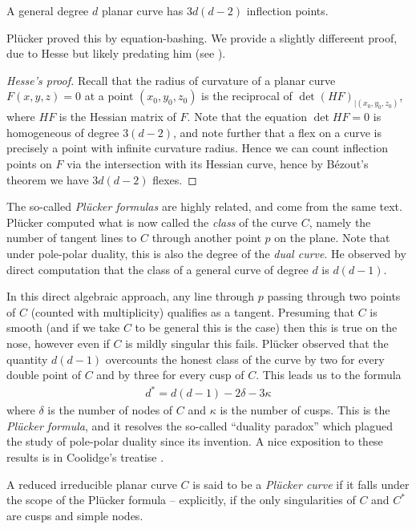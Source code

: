 \documentclass[11pt]{amsart}
\begin{document}
\begin{theorem}[Plucker, 1835] A general degree $d$ planar curve has $3d(d-2)$ inflection points.
\end{theorem}
Pl\"{u}cker proved this by equation-bashing. We provide a slightly differeent proof, due to Hesse but likely predating him (see \cite[p.~169]{Gray-worlds}).

\begin{proof}[Hesse's proof]
Recall that the radius of curvature of a planar curve $F(x,y,z)=0$ at a point $(x_0,y_0,z_0)$ is the reciprocal of $\det(HF)_{|(x_0,y_0,z_0)}$, where $HF$ is the Hessian matrix of $F$. Note that the equation $\det HF=0$ is homogeneous of degree $3(d-2)$, and note further that a flex on a curve is precisely a point with infinite curvature radius. Hence we can count inflection points on $F$ via the intersection with its Hessian curve, hence by B\'{e}zout's theorem we have $3d(d-2)$ flexes.
\end{proof}

The so-called \textit{Pl\"ucker formulas} are highly related, and come from the same text. Pl\"{u}cker computed what is now called the \textit{class} of the curve $C$, namely the number of tangent lines to $C$ through another point $p$ on the plane. Note that under pole-polar duality, this is also the degree of the \textit{dual curve}. He observed by direct computation that the class of a general curve of degree $d$ is $d(d-1)$.

In this direct algebraic approach, any line through $p$ passing through two points of $C$ (counted with multiplicity) qualifies as a tangent. Presuming that $C$ is smooth (and if we take $C$ to be general this is the case) then this is true on the nose, however even if $C$ is mildly singular this fails. Pl\"{u}cker observed that the quantity $d(d-1)$ overcounts the honest class of the curve by two for every double point of $C$ and by three for every cusp of $C$. This leads us to the formula
\begin{align*}
    d^\ast = d(d-1) - 2\delta - 3\kappa
\end{align*}
where $\delta$ is the number of nodes of $C$ and $\kappa$ is the number of cusps. This is the \textit{Pl\"ucker formula}, and it resolves the so-called ``duality paradox'' which plagued the study of pole-polar duality since its invention. A nice exposition to these results is in Coolidge's treatise \cite[Chapter~VI]{Coolidge}.

\begin{terminology} A reduced irreducible planar curve $C$ is said to be a \textit{Pl\"ucker curve} if it falls under the scope of the Pl\"{u}cker formula -- explicitly, if the only singularities of $C$ and $C^\ast$ are cusps and simple nodes. 
\end{terminology}
\end{document}
